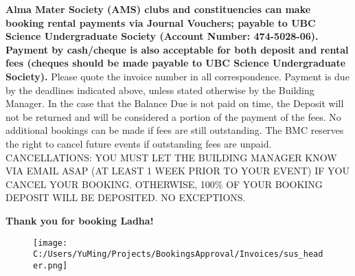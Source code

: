 \documentclass{article}%
\begin{document}
\newline%
\newline%
\textbf{Alma Mater Society (AMS) clubs and constituencies         can make booking rental payments via Journal Vouchers; payable to UBC Science Undergraduate Society         (Account Number: 474{-}5028{-}06). Payment by cash/cheque is also acceptable for both deposit and rental fees         (cheques should be made payable to UBC Science Undergraduate Society).}%
\newline%
\newline%
Please quote the invoice number in all correspondence.         Payment is due by the deadlines indicated above, unless stated otherwise by the Building Manager.         In the case that the Balance Due is not paid on time, the Deposit will not be returned         and will be considered a portion of the payment of the fees. No additional bookings can be made if fees are still outstanding.         The BMC reserves the right to cancel future events if outstanding fees are unpaid.%
\newline%
\newline%
CANCELLATIONS:  YOU MUST LET THE BUILDING MANAGER KNOW VIA EMAIL ASAP         (AT LEAST 1 WEEK PRIOR TO YOUR EVENT) IF YOU CANCEL YOUR BOOKING.         OTHERWISE, 100\% OF YOUR BOOKING DEPOSIT WILL BE DEPOSITED. NO EXCEPTIONS.%
\newline%
\begin{center}%
\textbf{Thank you for booking Ladha!}%
\end{center}%
\newpage%


\begin{figure}[h!]%
\centering%
\centering%
\texttt{[image: C:/Users/YuMing/Projects/BookingsApproval/Invoices/sus\_header.png]}%
\end{figure}
\end{document}
